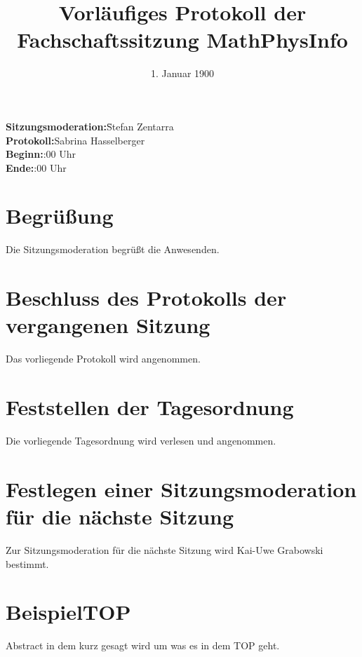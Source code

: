 \documentclass[fachschaft=physik]{mathphys/mathphys-protocol-experimental}
\begin{document}
\date{\vspace{-2em}1. Januar 1900\vspace{-1em}} %
\title{\vspace{-2em}Vorläufiges Protokoll der Fachschaftssitzung MathPhysInfo} %
\maketitle

\begin{tabbing}
\textbf{Sitzungsmoderation:}\quad\=Stefan Zentarra\\ %
\textbf{Protokoll:}\>Sabrina Hasselberger\\ %
\textbf{Beginn:}:00 Uhr\\
\textbf{Ende:}:00 Uhr\\ %
\end{tabbing}

\section{Begrüßung}
Die Sitzungsmoderation begrüßt die Anwesenden.

\section{Beschluss des Protokolls der vergangenen Sitzung}
Das vorliegende Protokoll wird angenommen.

\section{Feststellen der Tagesordnung}
Die vorliegende Tagesordnung wird verlesen und angenommen.

\section{Festlegen einer Sitzungsmoderation für die nächste Sitzung}
Zur Sitzungsmoderation für die nächste Sitzung wird Kai-Uwe Grabowski bestimmt. %

\section{BeispielTOP} %
Abstract in dem kurz gesagt wird um was es in dem TOP geht. %
\end{document}
